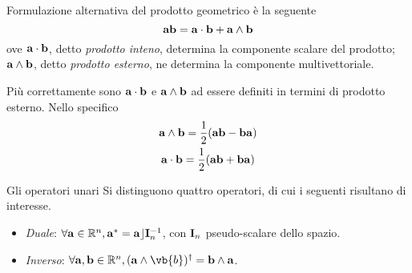 \begin{frame}
    Formulazione alternativa del prodotto geometrico è la seguente
    \[
        \mathbf{ab} = \mathbf{a} \cdot \mathbf{b} + \mathbf{a} \wedge \mathbf{b}
    \]
    ove \(\mathbf{a} \cdot \mathbf{b}\), detto \emph{prodotto inteno},
    determina la componente scalare del prodotto; 
    \(\mathbf{a} \wedge \mathbf{b}\), detto \emph{prodotto esterno},
    ne determina la componente multivettoriale.

    Più correttamente sono \(\mathbf{a} \cdot \mathbf{b}\) e \(\mathbf{a} \wedge \mathbf{b}\)
    ad essere definiti in termini di prodotto esterno. 
    Nello specifico
    \[\begin{gathered}
        \mathbf{a} \wedge \mathbf{b} = \frac{1}{2}(\mathbf{ab} - \mathbf{ba}) \\ 
        \mathbf{a} \cdot \mathbf{b} = \frac{1}{2}(\mathbf{ab} + \mathbf{ba})
    \end{gathered}\]
\end{frame}
\begin{frame}{Gli operatori unari}
    Si distinguono quattro operatori, di cui i seguenti risultano di interesse.
    \begin{itemize}
        \item \emph{Duale}: \(\forall \mathbf{a} \in \mathbb{R}^{n},
            \mathbf{a^{*}} = \mathbf{a} \rfloor \mathbf{I}_{n}^{-1}\), con \(\mathbf{I}_{n}\)
            pseudo-scalare dello spazio.
        \item \emph{Inverso}: \(\forall \Vb{a}, \Vb{b} \in \mathbb{R}^{n},
            (\Vb{a} \wedge \vb{b})^{\dagger} = \Vb{b} \wedge \Vb{a}\).
    \end{itemize}
\end{frame}
